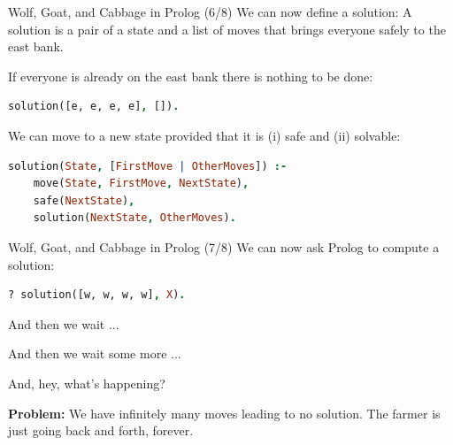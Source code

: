 \begin{frame}[fragile]{Wolf, Goat, and Cabbage in Prolog (6/8)}
We can now define a solution: A solution is a pair of a state and a list of
moves that brings everyone safely to the east bank.

\pause

If everyone is already on the east bank there is nothing to be done:

\begin{lstlisting}[language=prolog, xleftmargin=0.5cm]
solution([e, e, e, e], []).
\end{lstlisting}

\pause 

We can move to a new state provided that it is (i) safe and (ii) solvable:

\begin{lstlisting}[language=prolog, xleftmargin=0.5cm]
solution(State, [FirstMove | OtherMoves]) :- 
    move(State, FirstMove, NextState), 
    safe(NextState), 
    solution(NextState, OtherMoves).
\end{lstlisting}
\end{frame}

\begin{frame}[fragile]{Wolf, Goat, and Cabbage in Prolog (7/8)}
We can now ask Prolog to compute a solution:

\begin{lstlisting}[language=prolog, xleftmargin=0.5cm]
? solution([w, w, w, w], X).
\end{lstlisting}

\pause 

And then we wait ...

\pause 

And then we wait some more ...

\pause 

And, hey, what's happening?

\pause 

\textbf{Problem:} We have infinitely many moves leading to no solution. The
farmer is just going back and forth, forever. 
\end{frame}

